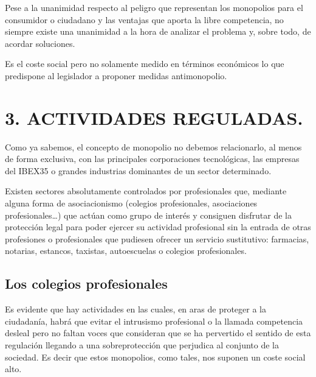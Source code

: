 \documentclass[
]{article}
\begin{document}
Pese a la unanimidad respecto al peligro que representan los monopolios
para el consumidor o ciudadano y las ventajas que aporta la libre
competencia, no siempre existe una unanimidad a la hora de analizar el
problema y, sobre todo, de acordar soluciones.

Es el coste social pero no solamente medido en términos económicos lo
que predispone al legislador a proponer medidas antimonopolio.

\hypertarget{section}{%
\subsection*{}\label{section}}

\hypertarget{actividades-reguladas.}{%
\section{3. ACTIVIDADES REGULADAS.}\label{actividades-reguladas.}}

Como ya sabemos, el concepto de monopolio no debemos relacionarlo, al
menos de forma exclusiva, con las principales corporaciones
tecnológicas, las empresas del IBEX35 o grandes industrias dominantes de
un sector determinado.

Existen sectores absolutamente controlados por profesionales que,
mediante alguna forma de asociacionismo (colegios profesionales,
asociaciones profesionales\ldots) que actúan como grupo de interés y
consiguen disfrutar de la protección legal para poder ejercer su
actividad profesional sin la entrada de otras profesiones o
profesionales que pudiesen ofrecer un servicio sustitutivo: farmacias,
notarias, estancos, taxistas, autoescuelas o colegios profesionales.

\hypertarget{los-colegios-profesionales}{%
\subsection*{Los colegios
profesionales}\label{los-colegios-profesionales}}

Es evidente que hay actividades en las cuales, en aras de proteger a la
ciudadanía, habrá que evitar el intrusismo profesional o la llamada
competencia desleal pero no faltan voces que consideran que se ha
pervertido el sentido de esta regulación llegando a una sobreprotección
que perjudica al conjunto de la sociedad. Es decir que estos monopolios,
como tales, nos suponen un coste social alto.
\end{document}
